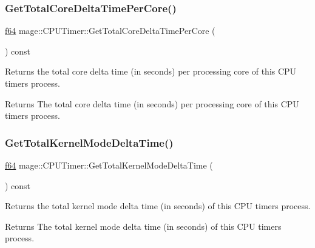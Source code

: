 \subsubsection{\texorpdfstring{Get\+Total\+Core\+Delta\+Time\+Per\+Core()}{GetTotalCoreDeltaTimePerCore()}}
{\footnotesize\ttfamily \hyperlink{namespacemage_ab935747c6941320bd6214b5a5f265b09}{f64} mage\+::\+C\+P\+U\+Timer\+::\+Get\+Total\+Core\+Delta\+Time\+Per\+Core (\begin{DoxyParamCaption}{ }\end{DoxyParamCaption}) const\hspace{0.3cm}{\ttfamily [noexcept]}}

Returns the total core delta time (in seconds) per processing core of this C\+PU timer\textquotesingle{}s process.

\begin{DoxyReturn}{Returns}
The total core delta time (in seconds) per processing core of this C\+PU timer\textquotesingle{}s process. 
\end{DoxyReturn}
\hypertarget{classmage_1_1_c_p_u_timer_ad4dde83f8b5db322e7a0ace33aaa5156}{}\label{classmage_1_1_c_p_u_timer_ad4dde83f8b5db322e7a0ace33aaa5156} 
\subsubsection{\texorpdfstring{Get\+Total\+Kernel\+Mode\+Delta\+Time()}{GetTotalKernelModeDeltaTime()}}
{\footnotesize\ttfamily \hyperlink{namespacemage_ab935747c6941320bd6214b5a5f265b09}{f64} mage\+::\+C\+P\+U\+Timer\+::\+Get\+Total\+Kernel\+Mode\+Delta\+Time (\begin{DoxyParamCaption}{ }\end{DoxyParamCaption}) const\hspace{0.3cm}{\ttfamily [noexcept]}}

Returns the total kernel mode delta time (in seconds) of this C\+PU timer\textquotesingle{}s process.

\begin{DoxyReturn}{Returns}
The total kernel mode delta time (in seconds) of this C\+PU timer\textquotesingle{}s process. 
\end{DoxyReturn}
\hypertarget{classmage_1_1_c_p_u_timer_a88f3772e09fced4f551d1d9bd0e5b3ce}{}\label{classmage_1_1_c_p_u_timer_a88f3772e09fced4f551d1d9bd0e5b3ce} 
